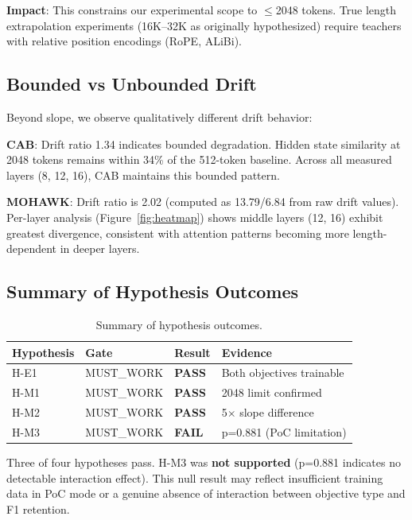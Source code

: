 \textbf{Impact}: This constrains our experimental scope to $\leq$2048 tokens. True length extrapolation experiments (16K--32K as originally hypothesized) require teachers with relative position encodings (RoPE, ALiBi).

\subsection{Bounded vs Unbounded Drift}

Beyond slope, we observe qualitatively different drift behavior:

\textbf{CAB}: Drift ratio 1.34 indicates bounded degradation. Hidden state similarity at 2048 tokens remains within 34\% of the 512-token baseline. Across all measured layers (8, 12, 16), CAB maintains this bounded pattern.

\textbf{MOHAWK}: Drift ratio is 2.02 (computed as 13.79/6.84 from raw drift values). Per-layer analysis (Figure~\ref{fig:heatmap}) shows middle layers (12, 16) exhibit greatest divergence, consistent with attention patterns becoming more length-dependent in deeper layers.

\subsection{Summary of Hypothesis Outcomes}

\begin{table}[h]
\centering
\begin{tabular}{llll}
\toprule
\textbf{Hypothesis} & \textbf{Gate} & \textbf{Result} & \textbf{Evidence} \\
\midrule
H-E1 & MUST\_WORK & \textbf{PASS} & Both objectives trainable \\
H-M1 & MUST\_WORK & \textbf{PASS} & 2048 limit confirmed \\
H-M2 & MUST\_WORK & \textbf{PASS} & 5$\times$ slope difference \\
H-M3 & MUST\_WORK & \textbf{FAIL} & p=0.881 (PoC limitation) \\
\bottomrule
\end{tabular}
\caption{Summary of hypothesis outcomes.}
\label{tab:outcomes}
\end{table}

Three of four hypotheses pass. H-M3 was \textbf{not supported} (p=0.881 indicates no detectable interaction effect). This null result may reflect insufficient training data in PoC mode or a genuine absence of interaction between objective type and F1 retention.
